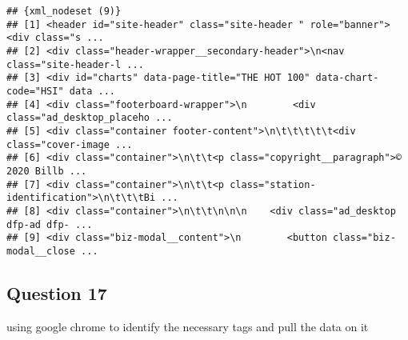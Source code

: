 \documentclass[
]{article}
\newenvironment{Shaded}{\begin{snugshade}}{\end{snugshade}}
\newcommand{\KeywordTok}[1]{\textcolor[rgb]{0.13,0.29,0.53}{\textbf{#1}}}
\newcommand{\NormalTok}[1]{#1}
\newcommand{\OperatorTok}[1]{\textcolor[rgb]{0.81,0.36,0.00}{\textbf{#1}}}
\newcommand{\StringTok}[1]{\textcolor[rgb]{0.31,0.60,0.02}{#1}}
\begin{document}
\begin{Shaded}
\end{Shaded}

\begin{verbatim}
## {xml_nodeset (9)}
## [1] <header id="site-header" class="site-header " role="banner"><div class="s ...
## [2] <div class="header-wrapper__secondary-header">\n<nav class="site-header-l ...
## [3] <div id="charts" data-page-title="THE HOT 100" data-chart-code="HSI" data ...
## [4] <div class="footerboard-wrapper">\n        <div class="ad_desktop_placeho ...
## [5] <div class="container footer-content">\n\t\t\t\t\t<div class="cover-image ...
## [6] <div class="container">\n\t\t<p class="copyright__paragraph">© 2020 Billb ...
## [7] <div class="container">\n\t\t<p class="station-identification">\n\t\t\tBi ...
## [8] <div class="container">\n\t\t\n\n\n    <div class="ad_desktop dfp-ad dfp- ...
## [9] <div class="biz-modal__content">\n        <button class="biz-modal__close ...
\end{verbatim}

\hypertarget{question-17}{%
\subsection{Question 17}\label{question-17}}

using google chrome to identify the necessary tags and pull the data on
it
\end{document}

